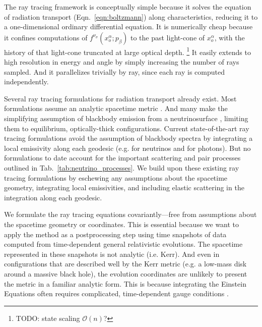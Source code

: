 \documentclass[aps,floatfix,prd,superscriptaddress,twocolumn]{revtex4-1}
\begin{document}
The ray tracing framework
is conceptually simple because it solves the equation of radiation
transport (Eqn.~\ref{eqn:boltzmann}) along characteristics,
reducing it to a one-dimensional ordinary differential equation.
It is numerically cheap because it confines computations of
$f^{\nu_\sigma}(x_o^\alpha;p_\beta)$ to the past light-cone of $x_o^\alpha$,
with the history of that light-cone truncated at large optical depth.
\footnote{TODO: state scaling $\mathscr{O}(n)$?}
It easily extends to high resolution in energy and angle by simply
increasing the number of rays sampled.
And it parallelizes trivially by ray, since each ray is computed
independently.

Several ray tracing formulations for radiation transport already exist.
Most formulations assume an analytic spacetime metric
\citep{birk2007-nunubar, caba2009-detecting_grb_nu,
  hari2010-gr_nunubar_collapsar, kova2011-gr_ray_tracing}.
And many make the simplifying assumption of blackbody emission from a
neutrinosurface
\citep{birk2007-nunubar, caba2009-detecting_grb_nu, kova2011-gr_ray_tracing},
limiting them to equilibrium, optically-thick configurations.
Current state-of-the-art ray tracing formulations avoid the assumption of
blackbody spectra by integrating a local emissivity along each geodesic
(e.g. \cite{hari2010-gr_nunubar_collapsar} for neutrinos and
\cite{youn2012-gr_radiative_transfer} for photons).
But no formulations to date account for the important scattering and pair
processes outlined in Tab.~\ref{tab:neutrino_processes}.
We build upon these existing ray tracing formulations
by eschewing any assumptions about the spacetime geometry,
integrating local emissivities,
and including elastic scattering in the integration along each geodesic.

We formulate the ray tracing equations covariantly---free from
assumptions about the spacetime geometry or coordinates. This is essential
because we want to apply the method as a postprocessing step using
time snapshots of data computed from time-dependent general relativistic evolutions.
The spacetime represented in these snapshots is not analytic (i.e. Kerr).
And even in configurations that are described well by the Kerr metric
(e.g. a low-mass disk around a massive black hole),
the evolution coordinates are unlikely to present the metric in
a familiar analytic form.
This is because integrating the Einstein Equations often requires complicated,
time-dependent gauge conditions
\citep{lind2007-gen_harmonic, fouc2013-compactness_and_spin}.
\end{document}
